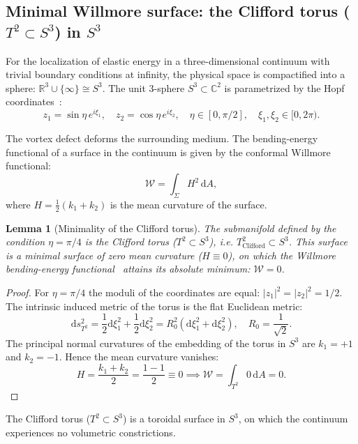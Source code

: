 \documentclass[11pt,a4paper]{article}
\newtheorem{lemma}[theorem]{Lemma}
\theoremstyle{definition}
\theoremstyle{remark}
\begin{document}
\subsection{Minimal Willmore surface: the Clifford torus ($T^2 \subset S^3$) in $S^3$}
	
For the localization of elastic energy in a three-dimensional continuum with trivial boundary conditions at infinity, the physical space is compactified into a sphere: $\mathbb{R}^3 \cup \{\infty\} \cong S^3$. The unit 3-sphere $S^3 \subset \mathbb{C}^2$ is parametrized by the Hopf coordinates~\cite{Hopf1931}:
\begin{equation}
	z_1 = \sin\eta \, e^{i\xi_1}, \quad z_2 = \cos\eta \, e^{i\xi_2}, \quad \eta \in [0, \pi/2], \quad \xi_1, \xi_2 \in [0, 2\pi).
	\label{eq:hopf_coordinates_def}
\end{equation}
	
The vortex defect deforms the surrounding medium. The bending-energy functional of a surface in the continuum is given by the conformal Willmore functional:
\begin{equation}
	\mathcal{W} = \int_{\Sigma} H^2 \, \mathrm{d}A,
	\label{eq:willmore_functional_def}
\end{equation}
	where $H = \frac{1}{2}(k_1 + k_2)$ is the mean curvature of the surface.
	
\begin{lemma}[Minimality of the Clifford torus]
\label{lem:clifford_minimal_surface}
The submanifold defined by the condition $\eta = \pi/4$ is the Clifford torus ($T^2 \subset S^3$), i.e. $T^2_{\mathrm{Clifford}} \subset S^3$. This surface is a minimal surface of zero mean curvature ($H \equiv 0$), on which the Willmore bending-energy functional~\cite{Willmore1965} attains its absolute minimum: $\mathcal{W} = 0$.
\end{lemma}
	
\begin{proof}
For $\eta = \pi/4$ the moduli of the coordinates are equal: $|z_1|^2 = |z_2|^2 = 1/2$. The intrinsic induced metric of the torus is the flat Euclidean metric:
\begin{equation}
	\mathrm{d}s^2_{T^2} = \frac{1}{2}\mathrm{d}\xi_1^2 + \frac{1}{2}\mathrm{d}\xi_2^2 = R_0^2 (\mathrm{d}\xi_1^2 + \mathrm{d}\xi_2^2), \quad R_0 = \frac{1}{\sqrt{2}}.
	\label{eq:clifford_flat_metric}
\end{equation}
The principal normal curvatures of the embedding of the torus in $S^3$ are $k_1 = +1$ and $k_2 = -1$. Hence the mean curvature vanishes:
\begin{equation}
	H = \frac{k_1 + k_2}{2} = \frac{1 - 1}{2} \equiv 0 \implies \mathcal{W} = \int_{T^2} 0 \, \mathrm{d}A = 0.
	\label{eq:clifford_zero_mean_curvature}
\end{equation}
\end{proof}
The Clifford torus ($T^2 \subset S^3$) is a toroidal surface in $S^3$, on which the continuum experiences no volumetric constrictions.
	
\end{document}
